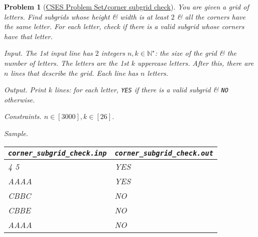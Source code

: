 \documentclass{article}
\newtheorem{problem}{Problem}
\begin{document}
\begin{problem}[\href{https://cses.fi/problemset/task/3360}{CSES Problem Set{\tt/}corner subgrid check}]
    You are given a grid of letters. Find subgrids whose height \& width is at least $2$ \& all the corners have the same letter. For each letter, check if there is a valid subgrid whose corners have that letter.
    \item {\sf Input.} The 1st input line has $2$ integers $n,k\in\mathbb{N}^\star$: the size of the grid \& the number of letters. The letters are the 1st $k$ uppercase letters. After this, there are $n$ lines that describe the grid. Each line has $n$ letters.
    \item {\sf Output.} Print $k$ lines: for each letter, {\tt YES} if there is a valid subgrid \& {\tt NO} otherwise.
    \item {\sf Constraints.} $n\in[3000],k\in[26]$.
    \item {\sf Sample.}
    \begin{table}[H]
        \centering
        \begin{tabular}{|l|l|}
            \hline
            \verb|corner_subgrid_check.inp| & \verb|corner_subgrid_check.out| \\
            \hline
            4 5 & YES \\
            AAAA & YES \\
            CBBC & NO \\
            CBBE & NO \\
            AAAA & NO \\            
            \hline
        \end{tabular}
    \end{table}
\end{problem}
\end{document}
